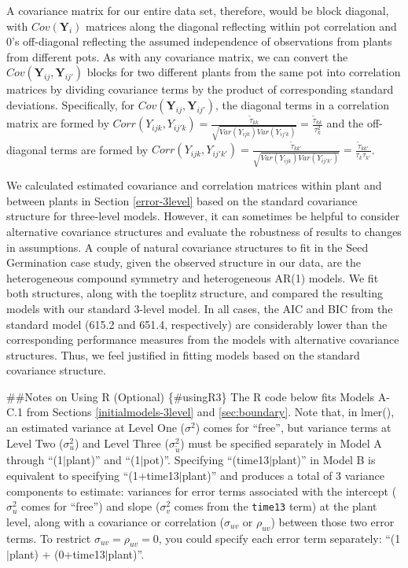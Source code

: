 \documentclass[
]{krantz}
\begin{document}
A covariance matrix for our entire data set, therefore, would be block diagonal, with \(Cov(\textbf{Y}_{i})\) matrices along the diagonal reflecting within pot correlation and 0's off-diagonal reflecting the assumed independence of observations from plants from different pots. As with any covariance matrix, we can convert the \(Cov(\textbf{Y}_{ij},\textbf{Y}_{ij'})\) blocks for two different plants from the same pot into correlation matrices by dividing covariance terms by the product of corresponding standard deviations. Specifically, for \(Cov(\textbf{Y}_{ij},\textbf{Y}_{ij'})\), the diagonal terms in a correlation matrix are formed by \(Corr(Y_{ijk},Y_{ij'k})=\frac{\tilde{\tau}_{kk}}{\sqrt{Var(Y_{ijk})Var(Y_{ij'k})}}=\frac{\tilde{\tau}_{kk}}{\tau_{k}^{2}}\) and the off-diagonal terms are formed by \(Corr(Y_{ijk},Y_{ij'k'})=\frac{\tilde{\tau}_{kk'}}{\sqrt{Var(Y_{ijk})Var(Y_{ij'k'})}}=\frac{\tilde{\tau}_{kk'}}{\tau_{k}\tau_{k'}}\).

We calculated estimated covariance and correlation matrices within plant and between plants in Section \ref{error-3level} based on the standard covariance structure for three-level models. However, it can sometimes be helpful to consider alternative covariance structures and evaluate the robustness of results to changes in assumptions. A couple of natural covariance structures to fit in the Seed Germination case study, given the observed structure in our data, are the heterogeneous compound symmetry and heterogeneous AR(1) models. We fit both structures, along with the toeplitz structure, and compared the resulting models with our standard 3-level model. In all cases, the AIC and BIC from the standard model (615.2 and 651.4, respectively) are considerably lower than the corresponding performance measures from the models with alternative covariance structures. Thus, we feel justified in fitting models based on the standard covariance structure.

\#\#Notes on Using R (Optional) \{\#usingR3\}
The R code below fits Models A-C.1 from Sections \ref{initialmodels-3level} and \ref{sec:boundary}. Note that, in lmer(), an estimated variance at Level One (\(\sigma^{2}\)) comes for ``free'', but variance terms at Level Two (\(\sigma_{u}^{2}\)) and Level Three (\(\sigma_{\tilde{u}}^{2}\)) must be specified separately in Model A through ``(1\(|\)plant)'' and ``(1\(|\)pot)''. Specifying ``(time13\(|\)plant)'' in Model B is equivalent to specifying ``(1+time13\(|\)plant)'' and produces a total of 3 variance components to estimate: variances for error terms associated with the intercept (\(\sigma_{u}^{2}\) comes for ``free'') and slope (\(\sigma_{v}^{2}\) comes from the \texttt{time13} term) at the plant level, along with a covariance or correlation (\(\sigma_{uv}\) or \(\rho_{uv}\)) between those two error terms. To restrict \(\sigma_{uv} = \rho_{uv} = 0\), you could specify each error term separately: ``(1\(|\)plant) + (0+time13\(|\)plant)''.
\end{document}
